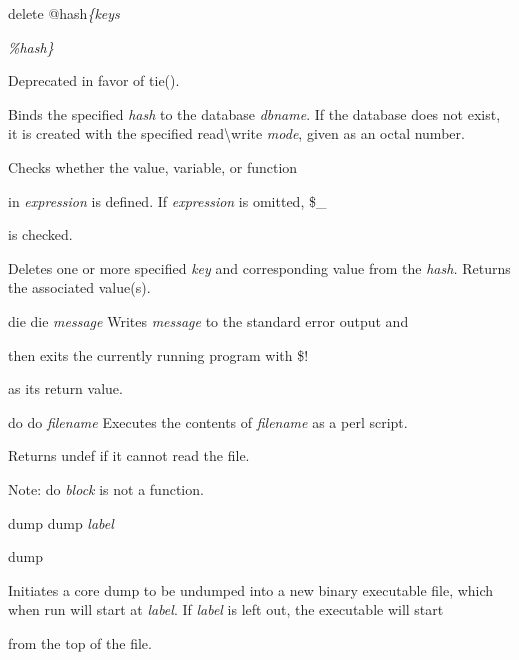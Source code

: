 \documentclass[a4paper,11pt]{book}
\begin{document}
\noindent 

\noindent delete @hash\textit{\{keys}

\noindent \textit{\%hash\}}

\noindent 

\noindent Deprecated in favor of tie().

\noindent 

\noindent Binds the specified \textit{hash }to the database \textit{dbname}. If the database does not exist, it is created with the specified read\textbackslash write \textit{mode}, given as an octal number.

\noindent 

\noindent Checks whether the value, variable, or function

\noindent in \textit{expression }is defined. If \textit{expression }is omitted, \$\_

\noindent is checked.

\noindent 

\noindent Deletes one or more specified \textit{key }and corresponding value from the \textit{hash. }Returns the associated value(s).

\noindent 

\noindent die die \textit{message }Writes \textit{message }to the standard error output and

\noindent then exits the currently running program with \$!

\noindent as its return value.

\noindent 

\noindent do do \textit{filename }Executes the contents of \textit{filename }as a perl script.

\noindent Returns undef if it cannot read the file.

\noindent 

\noindent Note: do \textit{block }is not a function.

\noindent 

\noindent dump dump \textit{label}

\noindent 

\noindent dump

\noindent 

\noindent Initiates a core dump to be undumped into a new binary executable file, which when run will start at \textit{label}. If \textit{label }is left out, the executable will start

\noindent from the top of the file.

\noindent 
\end{document}
